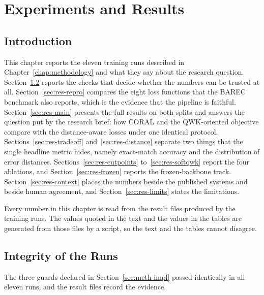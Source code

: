 \chapter{Experiments and Results}
\label{chap:results}

\section{Introduction}

This chapter reports the eleven training runs described in Chapter~\ref{chap:methodology} and
what they say about the research question. Section~\ref{sec:res-integrity} reports the checks
that decide whether the numbers can be trusted at all. Section~\ref{sec:res-repro} compares the
eight loss functions that the BAREC benchmark also reports, which is the evidence that the
pipeline is faithful. Section~\ref{sec:res-main} presents the full results on both splits and
answers the question put by the research brief: how CORAL and the QWK-oriented objective
compare with the distance-aware losses under one identical protocol.
Sections~\ref{sec:res-tradeoff} and~\ref{sec:res-distance} separate two things that the single
headline metric hides, namely exact-match accuracy and the distribution of error distances.
Sections~\ref{sec:res-cutpoints} to~\ref{sec:res-softqwk} report the four ablations, and
Section~\ref{sec:res-frozen} reports the frozen-backbone track. Section~\ref{sec:res-context}
places the numbers beside the published systems and beside human agreement, and
Section~\ref{sec:res-limits} states the limitations.

Every number in this chapter is read from the result files produced by the training runs. The
values quoted in the text and the values in the tables are generated from those files by a
script, so the text and the tables cannot disagree.

\section{Integrity of the Runs}
\label{sec:res-integrity}

The three guards declared in Section~\ref{sec:meth-impl} passed identically in all eleven runs,
and the result files record the evidence.

